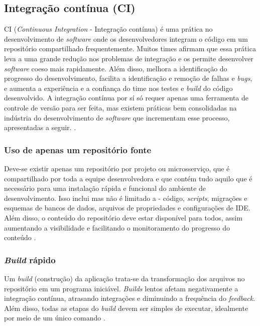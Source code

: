 \subsection{Integração contínua (CI)}
CI (\emph{Continuous Integration} - Integração contínua) é uma prática no desenvolvimento de \emph{software} onde os desenvolvedores integram o código em um repositório compartilhado frequentemente. Muitos times afirmam que essa prática leva a uma grande redução nos problemas de integração e os permite desenvolver \emph{software} coeso mais rapidamente. Além disso, melhora a identificação do progresso do desenvolvimento, facilita a identificação e remoção de falhas e \emph{bugs}, e aumenta a experiência e a confiança do time nos testes e \emph{build} do código desenvolvido. A integração contínua por sí só requer apenas uma ferramenta de controle de versão para ser feita, mas existem práticas bem consolidadas na indústria do desenvolvimento de \emph{software} que incrementam esse processo, apresentadas a seguir. \cite{martin-fowler-continuous-integration}.


\subsubsection{Uso de apenas um repositório fonte}
Deve-se existir apenas um repositório por projeto ou microsserviço, que é compartilhado por toda a equipe desenvolvedora e que contém tudo aquilo que é necessário para uma instalação rápida e funcional do ambiente de desenvolvimento. Isso inclui mas não é limitado a - código, \emph{scripts}, migrações e esquemas de bancos de dados, arquivos de propriedades e configurações de IDE. Além disso, o conteúdo do repositório deve estar disponível para todos, assim aumentando a visibilidade e facilitando o monitoramento do progresso do conteúdo \cite{gitlab-ci-cd,martin-fowler-continuous-integration}.


\subsubsection{\emph{Build} rápido}
Um \emph{build} (construção) da aplicação trata-se da transformação dos arquivos no repositório em um programa iniciável. \emph{Builds} lentos afetam negativamente a integração contínua, atrasando integrações e diminuindo a frequência do \emph{feedback}. Além disso, todas as etapas do \emph{build} devem ser simples de executar, idealmente por meio de um único comando \cite{martin-fowler-continuous-integration}.


